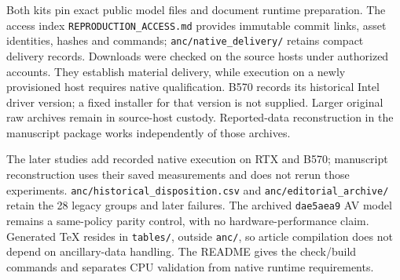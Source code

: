 Both kits pin exact public model files and document runtime preparation. The access index \texttt{REPRODUCTION\_ACCESS.md} provides immutable commit links, asset identities, hashes and commands; \texttt{anc/native\_delivery/} retains compact delivery records. Downloads were checked on the source hosts under authorized accounts. They establish material delivery, while execution on a newly provisioned host requires native qualification. B570 records its historical Intel driver version; a fixed installer for that version is not supplied. Larger original raw archives remain in source-host custody. Reported-data reconstruction in the manuscript package works independently of those archives.

The later studies add recorded native execution on RTX and B570; manuscript reconstruction uses their saved measurements and does not rerun those experiments. \texttt{anc/historical\_disposition.csv} and \texttt{anc/editorial\_archive/} retain the 28 legacy groups and later failures. The archived \texttt{dae5aea9} AV model remains a same-policy parity control, with no hardware-performance claim. Generated TeX resides in \texttt{tables/}, outside \texttt{anc/}, so article compilation does not depend on ancillary-data handling. The README gives the check/build commands and separates CPU validation from native runtime requirements.

